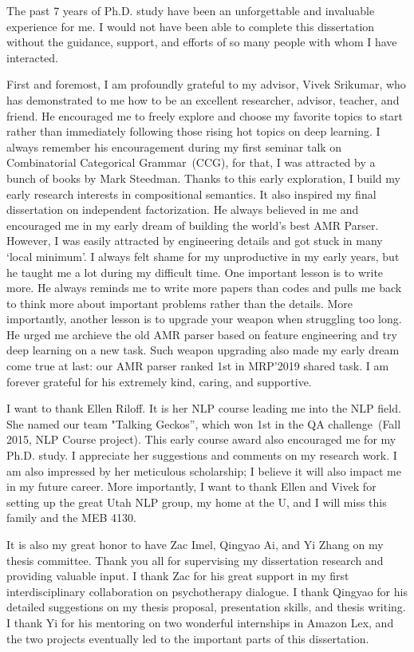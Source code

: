 The past 7 years of Ph.D. study have been an unforgettable and
invaluable experience for me. I would not have been able to complete
this dissertation without the guidance, support, and efforts of so
many people with whom I have interacted.

First and foremost, I am profoundly grateful to my advisor, Vivek
Srikumar, who has demonstrated to me how to be an excellent
researcher, advisor, teacher, and friend. He encouraged me to freely
explore and choose my favorite topics to start rather than immediately
following those rising hot topics on deep learning. I always remember
his encouragement during my first seminar talk on Combinatorial
Categorical Grammar~(CCG), for that, I was attracted by a bunch of
books by Mark Steedman. Thanks to this early exploration, I build my
early research interests in compositional semantics. It also
inspired my final dissertation on independent factorization. He always
believed in me and encouraged me in my early dream of building the world's
best AMR Parser. However, I was easily attracted by engineering
details and got stuck in many `local minimum'. I always felt shame
for my unproductive in my early years, but he taught me a lot during my
difficult time. One important lesson is to write more. He always
reminds me to write more papers than codes and pulls me back to think
more about important problems rather than the details. More importantly,
another lesson is to upgrade your weapon when struggling too long. He
urged me archieve the old AMR parser based on feature engineering and
try deep learning on a new task. Such weapon upgrading also made my
early dream come true at last: our AMR parser ranked 1st in MRP'2019
shared task. I am forever grateful for his extremely kind, caring, and
supportive.

I want to thank Ellen Riloff. It is her NLP course leading me
into the NLP field. She named our team "Talking Geckos”, which
won 1st in the QA challenge~(Fall 2015, NLP Course project). This early
course award also encouraged me for my Ph.D. study. I
appreciate her suggestions and comments on my research work. I
am also impressed by her meticulous scholarship; I believe it will
also impact me in my future career. More importantly, I want to thank
Ellen and Vivek for setting up the great Utah NLP group, my home at
the U, and I will miss this family and the MEB 4130.

It is also my great honor to have Zac Imel, Qingyao Ai, and Yi Zhang on
my thesis committee. Thank you all for supervising my dissertation
research and providing valuable input. I thank Zac for his great
support in my first interdisciplinary collaboration on psychotherapy
dialogue. I thank Qingyao for his detailed suggestions on my thesis
proposal, presentation skills, and thesis writing. I thank Yi for his
mentoring on two wonderful internships in Amazon Lex, and the two
projects eventually led to the important parts of this dissertation.

